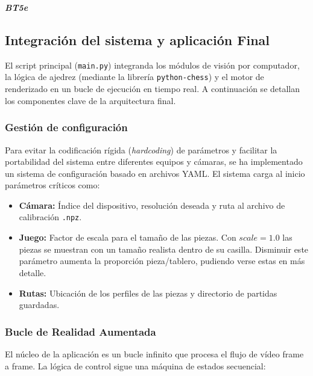\documentclass[11pt,a4paper]{article}
\begin{document}
\textit{\textbf{BT5e}}

\subsection{Integración del sistema y aplicación Final}

El script principal (\texttt{main.py}) integranda los módulos de visión por computador, la lógica de ajedrez (mediante la librería \texttt{python-chess}) y el motor de renderizado en un bucle de ejecución en tiempo real. A continuación se detallan los componentes clave de la arquitectura final.

\subsubsection{Gestión de configuración}

Para evitar la codificación rígida (\textit{hardcoding}) de parámetros y facilitar la portabilidad del sistema entre diferentes equipos y cámaras, se ha implementado un sistema de configuración basado en archivos YAML.
El sistema carga al inicio parámetros críticos como:
\begin{itemize}
    \item \textbf{Cámara:} Índice del dispositivo, resolución deseada y ruta al archivo de calibración \texttt{.npz}.
    \item \textbf{Juego:} Factor de escala para el tamaño de las piezas. Con $scale=1.0$ las piezas se muestran con un tamaño realista dentro de su casilla. Disminuir este parámetro aumenta la proporción pieza/tablero, pudiendo verse estas en más detalle.
    \item \textbf{Rutas:} Ubicación de los perfiles de las piezas y directorio de partidas guardadas.
\end{itemize}

\subsubsection{Bucle de Realidad Aumentada}

El núcleo de la aplicación es un bucle infinito que procesa el flujo de vídeo frame a frame. La lógica de control sigue una máquina de estados secuencial:
\end{document}
